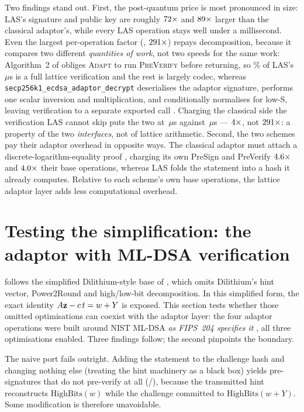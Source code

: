 Two findings stand out. First, the post-quantum price is most pronounced in
size: LAS's signature and public key are roughly $72\times$ and
$89\times$ larger than the classical adaptor's, while every LAS operation stays
well under a millisecond. Even the largest per-operation factor (\clRatioTimeMaxOp,
$291\times$) repays decomposition, because it compares two different
\emph{quantities of work}, not two speeds for the same work: Algorithm~2 of
\cite{esgin2020post} obliges \textsc{Adapt} to run \textsc{PreVerify} before returning, so
\adaptPreVerifyPct\% of LAS's \lasAdaptPackedUs\,$\mu$s is a full lattice verification and
the rest is largely codec, whereas \texttt{secp256k1\_ecdsa\_adaptor\_decrypt}
deserialises the adaptor signature, performs one scalar inversion and multiplication, and
conditionally normalises for low-S, leaving verification to a separate exported call
\cite{secp256k1zkp}. Charging the classical side the verification LAS cannot skip puts the
two at \clAdaptMatchedUs\,$\mu$s against \lasAdaptPackedUs\,$\mu$s ---
$4\times$, not $291\times$: a property of the two
\emph{interfaces}, not of lattice arithmetic. Second, the two schemes pay their
adaptor overhead in opposite ways. The classical adaptor must attach a
discrete-logarithm-equality proof \cite{fournier2019adaptor}, charging its own PreSign
and PreVerify $4.6\times$ and $4.0\times$ their base operations,
whereas LAS folds the statement into a hash it already computes. Relative to each
scheme's own base operations, the lattice adaptor layer adds less computational
overhead.

\section{Testing the simplification: the adaptor with ML-DSA verification}
\label{sec:res-mldsa}

 follows the simplified Dilithium-style base of \cite{esgin2020post}, which omits
Dilithium's hint vector, Power2Round and high/low-bit decomposition. In this simplified
form, the exact identity $A\mathbf{z}-c\,t=w+Y$ is exposed. This section tests whether those
omitted optimisations can coexist with the adaptor layer: the four adaptor operations were
built around NIST ML-DSA \emph{as FIPS~204 specifies it} \cite{1274601}, all three
optimisations enabled. Three findings follow; the second pinpoints the boundary.

\enlargethispage{\baselineskip}
The naive port fails outright. Adding the statement to the challenge hash and
changing nothing else (treating the hint machinery as a black box) yields
pre-signatures that do not pre-verify at all (\mldsaNaiveP{}/\mldsaIters{}), because the
transmitted hint reconstructs $\mathrm{HighBits}(w)$ while the challenge committed to
$\mathrm{HighBits}(w+Y)$. Some modification is therefore unavoidable.

